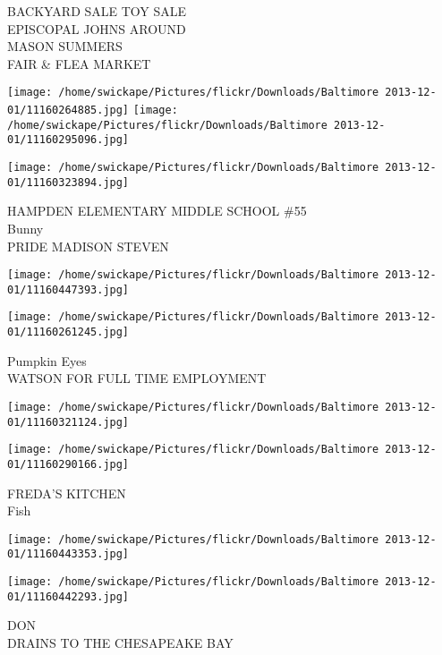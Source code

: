 \documentclass[10pt,letterpaper]{article}
\begin{document}
BACKYARD SALE TOY SALE\\
EPISCOPAL JOHNS AROUND\\
MASON SUMMERS\\
FAIR \& FLEA MARKET\\
\pagebreak

\texttt{[image: /home/swickape/Pictures/flickr/Downloads/Baltimore 2013-12-01/11160264885.jpg]}
\texttt{[image: /home/swickape/Pictures/flickr/Downloads/Baltimore 2013-12-01/11160295096.jpg]}

\vspace{0.25in}
\texttt{[image: /home/swickape/Pictures/flickr/Downloads/Baltimore 2013-12-01/11160323894.jpg]}

HAMPDEN ELEMENTARY MIDDLE SCHOOL \#55\\
Bunny\\
PRIDE MADISON STEVEN\\
\pagebreak

\texttt{[image: /home/swickape/Pictures/flickr/Downloads/Baltimore 2013-12-01/11160447393.jpg]}

\vspace{0.25in}
\texttt{[image: /home/swickape/Pictures/flickr/Downloads/Baltimore 2013-12-01/11160261245.jpg]}

Pumpkin Eyes\\
WATSON FOR FULL TIME EMPLOYMENT\\
\pagebreak

\texttt{[image: /home/swickape/Pictures/flickr/Downloads/Baltimore 2013-12-01/11160321124.jpg]}

\vspace{0.25in}
\texttt{[image: /home/swickape/Pictures/flickr/Downloads/Baltimore 2013-12-01/11160290166.jpg]}

FREDA'S KITCHEN\\
Fish\\
\pagebreak

\texttt{[image: /home/swickape/Pictures/flickr/Downloads/Baltimore 2013-12-01/11160443353.jpg]}

\vspace{0.25in}
\texttt{[image: /home/swickape/Pictures/flickr/Downloads/Baltimore 2013-12-01/11160442293.jpg]}

DON\\
DRAINS TO THE CHESAPEAKE BAY\\
\pagebreak
\end{document}
